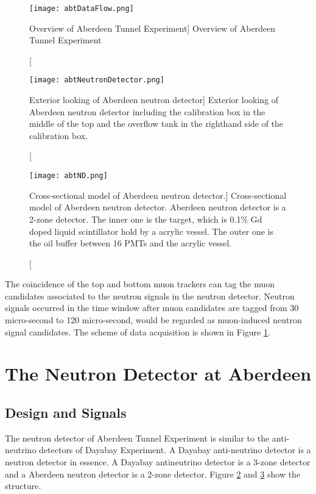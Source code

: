 \begin{figure}
    \label{fig:abtDataFlow}
    \centering
    \texttt{[image: abtDataFlow.png]}
    \caption
    [Overview of Aberdeen Tunnel Experiment]
    {Overview of Aberdeen Tunnel Experiment}
    \end{figure}


\begin{figure}
    \centering
    \texttt{[image: abtNeutronDetector.png]}
    \caption
    [Exterior looking of Aberdeen neutron detector]
    {Exterior looking of Aberdeen neutron detector including the calibration box in the middle of the top and the overflow tank in the righthand side of the calibration box.}
    \label{fig:abtNeutronDetector}
    \end{figure}

\begin{figure}
    \centering
    \texttt{[image: abtND.png]}
    \caption
    [Cross-sectional model of Aberdeen neutron detector.]
    {
Cross-sectional model of Aberdeen neutron detector.
Aberdeen neutron detector is a 2-zone detector. The inner one is the target, which is
0.1\% Gd doped liquid scintillator hold by a acrylic vessel.
The outer one is the oil buffer between 16 PMTs and the acrylic vessel.}
    \label{fig:abtND}
    \end{figure}







The coincidence of the top and bottom muon trackers can tag the muon candidates
associated to the neutron signals in the neutron detector. Neutron signals occurred
in the time window after muon candidates are tagged from 30 micro-second to
120 micro-second, would be regarded as muon-induced neutron signal candidates.
The scheme of data acquisition is shown in Figure \ref{fig:abtDataFlow}.




\section{The Neutron Detector at Aberdeen}
\label{sec:ND}
\subsection{Design and Signals}

The neutron detector of Aberdeen Tunnel Experiment is similar to the
anti-neutrino detectors of Dayabay Experiment. A Dayabay anti-neutrino
detector is a neutron detector in essence. A Dayabay antineutrino detector is a
3-zone detector and a Aberdeen neutron detector is a 2-zone detector.
Figure \ref{fig:abtNeutronDetector} and \ref{fig:abtND} show the structure.

